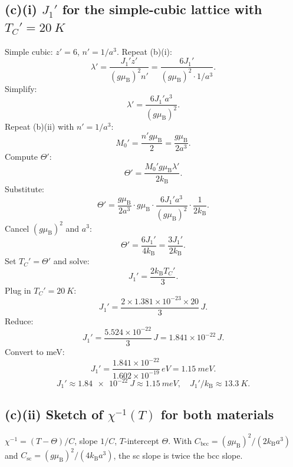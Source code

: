 \documentclass[11pt]{article}
\newcommand{\kB}{k_{\mathrm{B}}}
\newcommand{\muB}{\mu_{\mathrm{B}}}
\begin{document}
\subsection*{(c)(i) $J_1'$ for the simple-cubic lattice with $T_C'=\SI{20}{K}$}

Simple cubic: $z'=6$, $n'=1/a^3$. Repeat (b)(i):
\[
\lambda' = \frac{J_1' z'}{(g\muB)^2 n'} = \frac{6 J_1'}{(g\muB)^2\cdot 1/a^3}.
\]
Simplify:
\[
\lambda' = \frac{6J_1' a^3}{(g\muB)^2}.
\]
Repeat (b)(ii) with $n'=1/a^3$:
\[
M_0' = \frac{n' g\muB}{2} = \frac{g\muB}{2a^3}.
\]
Compute $\Theta'$:
\[
\Theta' = \frac{M_0' g\muB \lambda'}{2\kB}.
\]
Substitute:
\[
\Theta' = \frac{g\muB}{2a^3}\cdot g\muB\cdot\frac{6J_1' a^3}{(g\muB)^2}\cdot\frac{1}{2\kB}.
\]
Cancel $(g\muB)^2$ and $a^3$:
\[
\Theta' = \frac{6J_1'}{4\kB} = \frac{3J_1'}{2\kB}.
\]
Set $T_C'=\Theta'$ and solve:
\[
J_1' = \frac{2\kB T_C'}{3}.
\]
Plug in $T_C'=\SI{20}{K}$:
\[
J_1' = \frac{2\times 1.381\times 10^{-23}\times 20}{3}\,\si{J}.
\]
Reduce:
\[
J_1' = \frac{5.524\times 10^{-22}}{3}\,\si{J} = 1.841\times 10^{-22}\,\si{J}.
\]
Convert to meV:
\[
J_1' = \frac{1.841\times 10^{-22}}{1.602\times 10^{-19}}\,\si{eV} = \SI{1.15}{meV}.
\]
\begin{equation}
\boxed{\ J_1' \approx \SI{1.84e-22}{J} \approx \SI{1.15}{meV},\quad J_1'/\kB \approx \SI{13.3}{K}.\ }
\label{eq:J1pbox}
\end{equation}

\subsection*{(c)(ii) Sketch of $\chi^{-1}(T)$ for both materials}

$\chi^{-1}=(T-\Theta)/C$, slope $1/C$, $T$-intercept $\Theta$. With $C_{\mathrm{bcc}}=(g\muB)^2/(2\kB a^3)$ and $C_{\mathrm{sc}}=(g\muB)^2/(4\kB a^3)$, the sc slope is twice the bcc slope.

\begin{center}
\end{center}
\end{document}
